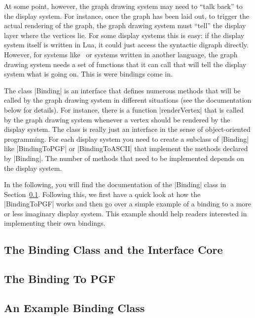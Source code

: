 At some point, however, the graph drawing system may need to ``talk back'' to
the display system. For instance, once the graph has been laid out, to trigger
the actual rendering of the graph, the graph drawing system must ``tell'' the
display layer where the vertices lie. For some display systems this is easy: if
the display system itself is written in Lua, it could just access the syntactic
digraph directly. However, for systems like \tikzname\ or systems written in
another language, the graph drawing system needs a set of functions that it can
call that will tell the display system what is going on. This is were bindings
come in.

The class |Binding| is an interface that defines numerous methods that will be
called by the graph drawing system in different situations (see the
documentation below for details). For instance, there is a function
|renderVertex| that is called by the graph drawing system whenever a vertex
should be rendered by the display system. The class is really just an interface
in the sense of object-oriented programming. For each display system you need
to create a subclass of |Binding| like |BindingToPGF| or |BindingToASCII| that
implement the methods declared by |Binding|. The number of methods that need to
be implemented depends on the display system.

In the following, you will find the documentation of the |Binding| class in
Section~\ref{section-gd-binding-doc}. Following this, we first have a quick
look at how the |BindingToPGF| works and then go over a simple example of a
binding to a more or less imaginary display system. This example should help
readers interested in implementing their own bindings.


\subsection{The Binding Class and the Interface Core}
\label{section-gd-binding-doc}



\subsection{The Binding To PGF}



\subsection{An Example Binding Class}

